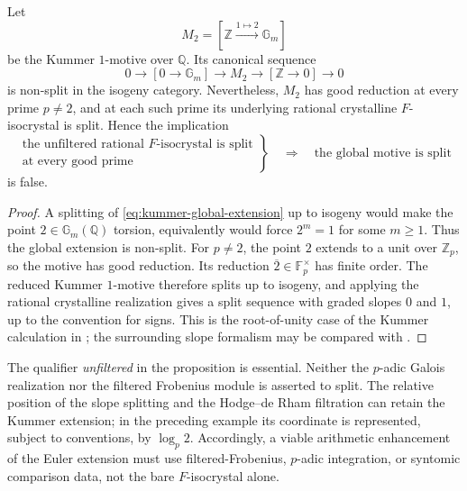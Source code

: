 \begin{proposition}
\label{prop:kummer-bare-frobenius-counterexample}
Let
\[
 M_2=[\mathbb Z\xrightarrow{1\mapsto2}\mathbb G_m]
\]
be the Kummer $1$-motive over $\mathbb Q$.  Its canonical sequence
\begin{equation}\label{eq:kummer-global-extension}
 0\longrightarrow[0\to\mathbb G_m]
 \longrightarrow M_2
 \longrightarrow[\mathbb Z\to0]
 \longrightarrow0
\end{equation}
is non-split in the isogeny category.  Nevertheless, $M_2$ has good
reduction at every prime $p\ne2$, and at each such prime its underlying
rational crystalline $F$-isocrystal is split.  Hence the implication
\[
 \left.
 \begin{array}{c}
 \text{the unfiltered rational $F$-isocrystal is split}\\
 \text{at every good prime}
 \end{array}
 \right\}
 \quad\Longrightarrow\quad
 \text{the global motive is split}
\]
is false.
\end{proposition}

\begin{proof}
A splitting of \eqref{eq:kummer-global-extension} up to isogeny would make
the point $2\in\mathbb G_m(\mathbb Q)$ torsion, equivalently would force
$2^m=1$ for some $m\ge1$.  Thus the global extension is non-split.  For
$p\ne2$, the point $2$ extends to a unit over $\mathbb Z_p$, so the motive
has good reduction.  Its reduction $\overline{2}\in\mathbb F_p^\times$ has
finite order.  The reduced Kummer $1$-motive therefore splits up to
isogeny, and applying the rational crystalline realization gives a split
sequence with graded slopes $0$ and $1$, up to the convention for signs.
This is the root-of-unity case of the Kummer calculation in
\cite[Example~6.3]{MohajerSebbar2025}; the surrounding slope formalism may be
compared with \cite{KedlayaIsocrystals}.
\end{proof}

The qualifier \emph{unfiltered} in the proposition is essential.  Neither
the $p$-adic Galois realization nor the filtered Frobenius module is asserted
to split.  The relative position of the slope splitting and the Hodge--de
Rham filtration can retain the Kummer extension; in the preceding example
its coordinate is represented, subject to conventions, by $\log_p2$.
Accordingly, a viable arithmetic enhancement of the Euler extension must
use filtered-Frobenius, $p$-adic integration, or syntomic comparison data,
not the bare $F$-isocrystal alone.

